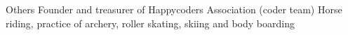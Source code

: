 






\begin{rubric}{Others}
  \entry*
  Founder and treasurer of Happycoders Association (coder team)
  \entry*
  Horse riding, practice of archery, roller skating, skiing and body boarding
\end{rubric}
